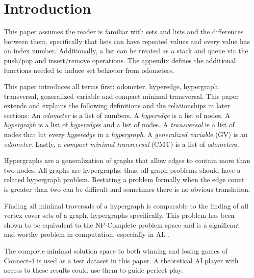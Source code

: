 













\chapter{Introduction}

This paper assumes the reader is familiar with sets and lists and the differences between them, specifically that lists can have repeated values and every value has an index number. Additionally, a list can be treated as a stack and queue via the push/pop and insert/remove operations. The appendix defines the additional functions needed to induce set behavior from odometers.

This paper introduces all terms first:  odometer, hyperedge, hypergraph, transversal, generalized variable and compact minimal transversal.  This paper extends and explains the following definitions and the relationships in later sections: An \emph{odometer} is a list of numbers. A \emph{hyperedge} is a list of nodes. A \emph{hypergraph} is a list of \emph{hyperedge}s and a list of nodes. A \emph{transversal} is a list of nodes that hit every \emph{hyperedge} in a \emph{hypergraph}. A \emph{generalized variable} (GV) is an \emph{odometer}. Lastly, a \emph{compact minimal transversal} (CMT) is a list of \emph{odometer}s. 

Hypergraphs are a generalization of graphs that allow edges to contain more than two nodes. All graphs are hypergraphs; thus, all graph problems should have a related hypergraph problem. Restating a problem formally when the edge count is greater than two can be difficult and sometimes there is no obvious translation. 

 Finding all minimal traversals of a hypergraph is comparable to the finding of all vertex cover sets of a graph, hypergraphs specifically. This problem has been shown to be equivalent to the NP-Complete problem space and is a significant and worthy problem in computation, especially in AI. \cite{eiter1991transveral,eiter1995identifying,reiter1987theory,de1987diagnosing}.

The complete minimal solution space to both winning and losing games of Connect-4 is used as a test dataset in this paper. A theoretical AI player with access to these results could use them to guide perfect play.


